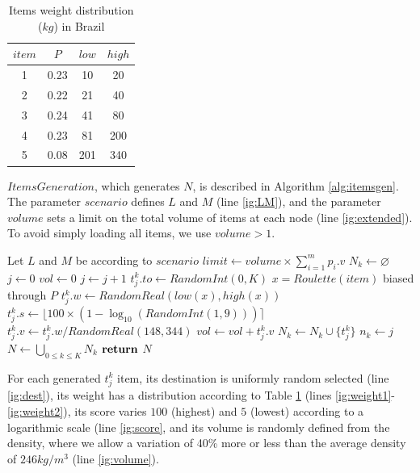 \documentclass[preprint,authoryear]{elsarticle}
\newcommand{\round}[1]{\ensuremath{\lfloor#1\rceil}}
\begin{document}
 
\begin{table}[H]
		\centering
		\caption{Items weight distribution ($kg$) in Brazil}  \label{tab:weights}
		\begin{tabular}{c c c c }
			\toprule
			$item$ & $P$ & $low$ & $high$  \\		
			\midrule
			1              & 0.23           & 10  & 20\\
			2              & 0.22           & 21  & 40\\
			3              & 0.24           & 41  & 80 \\		
			4              & 0.23           & 81  & 200\\
			5              & 0.08           & 201 & 340 \\
			\bottomrule
		\end{tabular}
\end{table}


$ItemsGeneration$, which generates $N$, is described in Algorithm \ref{alg:itemsgen}. The parameter $scenario$\/ defines $L$\/ and $M$\/ (line \ref{ig:LM}), and the parameter $volume$\/ sets a limit on the total volume of items at each node (line \ref{ig:extended}). To avoid simply loading all items, we use $volume > 1$.

\begin{algorithm}[H]
	\caption{$ItemsGeneration(scenario,volume)$}  \label{alg:itemsgen}
	\begin{algorithmic}[1]
		\State Let $L$ and $M$ be according to $scenario$ \label{ig:LM}
		\State $limit \gets volume \times \sum_{i=1}^{m} p_i.v$ \label{ig:extended}
			\State $N_k \gets \varnothing$
			\State $j \gets 0$
			\State $vol \gets 0$	\label{ig:totals}	
				\State $j \gets j+1$
				\Repeat
					\State $t_j^k.to \gets RandomInt(0, K)$ \label{ig:dest}
				\State $x = Roulette(item)$ biased through $P$ \label{ig:weight1}	
				\State $t_j^k.w \gets RandomReal(low(x), high(x))$        \label{ig:weight2}		
				\State $t_j^k.s \gets \round{100 \times (1 - \log_{10}(RandomInt(1, 9)))} $ \label{ig:score}
				\State $t_j^k.v \gets t_j^k.w / RandomReal(148, 344)$ \label{ig:volume}
				\State $vol \gets vol + t_j^k.v$ 
				\State $N_k \gets N_k \cup \{t_j^k\}$ 
			\EndWhile
			\State $n_k \gets j$
		\EndFor
		\State $N \gets \bigcup_{0 \leq k \leq K} N_k$ 
		\State ${\bf return}$ $N$
	\end{algorithmic}
\end{algorithm}

For each generated $t^k_j$\/ item, its destination is uniformly random selected (line \ref{ig:dest}), its weight has a distribution according to Table \ref{tab:weights} (lines \ref{ig:weight1}-\ref{ig:weight2}), its score varies $100$\/ (highest) and $5$\/ (lowest) according to a logarithmic scale (line \ref{ig:score}, and its volume is randomly defined from the density, where we allow a variation of 40\% more or less than the average density of $246 kg/m^3$\/ (line \ref{ig:volume}).
\end{document}
